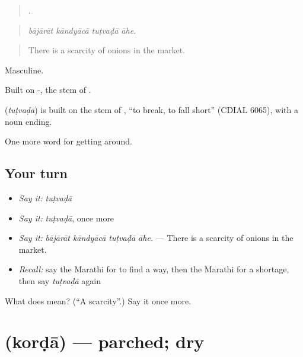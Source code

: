 \begin{quote}
   .
\end{quote}

\begin{quote}
\emph{bājārāt kāndyācā tuṭvaḍā āhe.}
\end{quote}

\begin{quote}
There is a scarcity of onions in the market.
\end{quote}

Masculine.

Built on -, the stem of .

\begin{cousinweb}
\textbf{} (\emph{tuṭvaḍā}) is built on the stem of \textbf{}, \textquotedblleft{}to break, to fall short\textquotedblright{} (CDIAL 6065), with a noun ending.
\end{cousinweb}

\begin{grammarlens}[title={What you've built}]
One more word for getting around.
\end{grammarlens}

\subsection*{Your turn}
\begin{itemize}
\raggedright
  \item \emph{Say it:} \emph{tuṭvaḍā}
  \item \emph{Say it:} \emph{tuṭvaḍā}, once more
  \item \emph{Say it:} \emph{bājārāt kāndyācā tuṭvaḍā āhe.} — There is a scarcity of onions in the market.
  \item \emph{Recall:} say the Marathi for to find a way, then the Marathi for a shortage, then say \emph{tuṭvaḍā} again
\end{itemize}

\begin{tcolorbox}[breakable,colback=teal!4,colframe=teal!35!black,title={Before you move on}]
What does  mean? (\textquotedblleft{}A scarcity\textquotedblright{}.) Say it once more.
\end{tcolorbox}
\section[\texorpdfstring{\mr{कोरडा} (korḍā)}{कोरडा (korḍā)}]{ (korḍā) — parched; dry}

